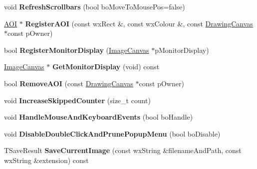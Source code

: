 \begin{DoxyCompactItemize}
\item 
\hypertarget{class_image_canvas_a84b28cbff150eb048eb75246ad18b738}{void {\bfseries Refresh\+Scrollbars} (bool bo\+Move\+To\+Mouse\+Pos=false)}\label{class_image_canvas_a84b28cbff150eb048eb75246ad18b738}

\item 
\hypertarget{class_image_canvas_acbb4a3aeb64bb169d6d27e4e2e75e1c0}{\hyperlink{struct_a_o_i}{A\+O\+I} $\ast$ {\bfseries Register\+A\+O\+I} (const wx\+Rect \&, const wx\+Colour \&, const \hyperlink{class_drawing_canvas}{Drawing\+Canvas} $\ast$const p\+Owner)}\label{class_image_canvas_acbb4a3aeb64bb169d6d27e4e2e75e1c0}

\item 
\hypertarget{class_image_canvas_ad038feaa07968d026c52a6c82758366b}{bool {\bfseries Register\+Monitor\+Display} (\hyperlink{class_image_canvas}{Image\+Canvas} $\ast$p\+Monitor\+Display)}\label{class_image_canvas_ad038feaa07968d026c52a6c82758366b}

\item 
\hypertarget{class_image_canvas_a0a3e041467a4d2072cc8cac89ecbd434}{\hyperlink{class_image_canvas}{Image\+Canvas} $\ast$ {\bfseries Get\+Monitor\+Display} (void) const }\label{class_image_canvas_a0a3e041467a4d2072cc8cac89ecbd434}

\item 
\hypertarget{class_image_canvas_a22d7e4b90533d43e64b23e858b0d3f9f}{bool {\bfseries Remove\+A\+O\+I} (const \hyperlink{class_drawing_canvas}{Drawing\+Canvas} $\ast$const p\+Owner)}\label{class_image_canvas_a22d7e4b90533d43e64b23e858b0d3f9f}

\item 
\hypertarget{class_image_canvas_ae6ed8408d025c286fcc7cf235a118642}{void {\bfseries Increase\+Skipped\+Counter} (size\+\_\+t count)}\label{class_image_canvas_ae6ed8408d025c286fcc7cf235a118642}

\item 
\hypertarget{class_image_canvas_acd14199ee130f90bdac4f3e49e134a3f}{void {\bfseries Handle\+Mouse\+And\+Keyboard\+Events} (bool bo\+Handle)}\label{class_image_canvas_acd14199ee130f90bdac4f3e49e134a3f}

\item 
\hypertarget{class_image_canvas_aca737316c7de89a68b160f9250f4757f}{void {\bfseries Disable\+Double\+Click\+And\+Prune\+Popup\+Menu} (bool bo\+Disable)}\label{class_image_canvas_aca737316c7de89a68b160f9250f4757f}

\item 
\hypertarget{class_image_canvas_abccf29fde25b2c93bcd5d7bedeb50625}{T\+Save\+Result {\bfseries Save\+Current\+Image} (const wx\+String \&filename\+And\+Path, const wx\+String \&extension) const }\label{class_image_canvas_abccf29fde25b2c93bcd5d7bedeb50625}


\end{DoxyCompactItemize}
